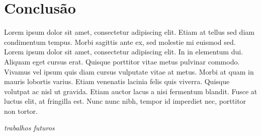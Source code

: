 \documentclass[12pt]{article}
\begin{document}
\section{Conclusão}

Lorem ipsum dolor sit amet, consectetur adipiscing elit. Etiam at tellus sed diam condimentum tempus. Morbi sagittis ante ex, sed molestie mi euismod sed. Lorem ipsum dolor sit amet, consectetur adipiscing elit. In in elementum dui. Aliquam eget cursus erat. Quisque porttitor vitae metus pulvinar commodo. Vivamus vel ipsum quis diam cursus vulputate vitae at metus. Morbi at quam in mauris lobortis varius. Etiam venenatis lacinia felis quis viverra. Quisque volutpat ac nisl ut gravida. Etiam auctor lacus a nisi fermentum blandit. Fusce at luctus elit, at fringilla est. Nunc nunc nibh, tempor id imperdiet nec, porttitor non tortor.

\textit{trabalhos futuros}



\end{document}
